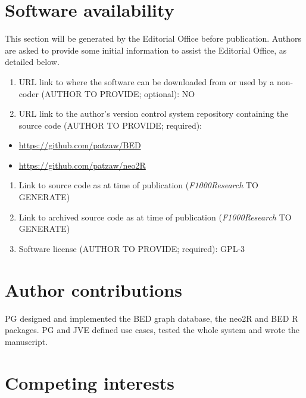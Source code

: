 \documentclass[9pt,a4paper,]{extarticle}
\theoremstyle{definition}
\theoremstyle{definition}
\theoremstyle{definition}
\theoremstyle{remark}
\begin{document}
\section{Software availability}\label{software-availability}

This section will be generated by the Editorial Office before publication. Authors are asked to provide some initial information to assist the Editorial Office, as detailed below.

\begin{enumerate}
\def\labelenumi{\arabic{enumi}.}
\item
  URL link to where the software can be downloaded from or used by a non-coder (AUTHOR TO PROVIDE; optional): NO
\item
  URL link to the author's version control system repository containing the source code (AUTHOR TO PROVIDE; required):
\end{enumerate}

\begin{itemize}
\item
  \url{https://github.com/patzaw/BED}
\item
  \url{https://github.com/patzaw/neo2R}
\end{itemize}

\begin{enumerate}
\def\labelenumi{\arabic{enumi}.}
\setcounter{enumi}{2}
\item
  Link to source code as at time of publication (\emph{F1000Research} TO GENERATE)
\item
  Link to archived source code as at time of publication (\emph{F1000Research} TO GENERATE)
\item
  Software license (AUTHOR TO PROVIDE; required): GPL-3
\end{enumerate}

\section{Author contributions}\label{author-contributions}

PG designed and implemented the BED graph database,
the neo2R and BED R packages.
PG and JVE defined use cases, tested the whole system and
wrote the manuscript.

\section{Competing interests}\label{competing-interests}
\end{document}
